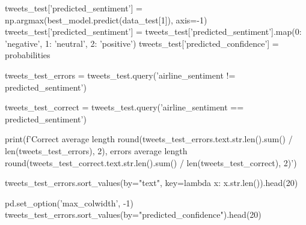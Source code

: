 \documentclass[11pt, a4paper, notitlepage]{report}
\begin{document}
\begin{appendices}
\begin{spverbatim}
tweets_test['predicted_sentiment'] = np.argmax(best_model.predict(data_test[1]), axis=-1)
tweets_test['predicted_sentiment'] = tweets_test['predicted_sentiment'].map({0: 'negative', 1: 'neutral', 2: 'positive'})
tweets_test['predicted_confidence'] = probabilities

tweets_test_errors = tweets_test.query('airline_sentiment != predicted_sentiment')

tweets_test_correct = tweets_test.query('airline_sentiment == predicted_sentiment')

print(f'Correct average length {round(tweets_test_errors.text.str.len().sum() / len(tweets_test_errors), 2)}, errors average length {round(tweets_test_correct.text.str.len().sum() / len(tweets_test_correct), 2)}')

tweets_test_errors.sort_values(by="text", key=lambda x: x.str.len()).head(20)

pd.set_option('max_colwidth', -1)
tweets_test_errors.sort_values(by="predicted_confidence").head(20)

\end{spverbatim}
\end{appendices}
\end{document}
